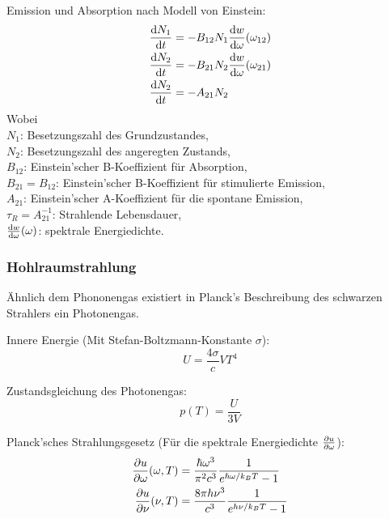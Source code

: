 			\noindent
			Emission und Absorption nach Modell von Einstein:
			\begin{equation}
				\begin{aligned}
					\frac{\mathrm{d} N_1}{\mathrm{d} t} &= -B_{12}N_1 \frac{\mathrm{d} w}{\mathrm{d} \omega}(\omega_{12}) \\
					\frac{\mathrm{d} N_2}{\mathrm{d} t} &= -B_{21}N_2 \frac{\mathrm{d} w}{\mathrm{d} \omega}(\omega_{21}) \\
					\frac{\mathrm{d} N_2}{\mathrm{d} t} &= -A_{21}N_2\\
				\end{aligned}
			\end{equation}
			Wobei \\
			\indent $N_1$: Besetzungszahl des Grundzustandes,\\
			\indent $N_2$: Besetzungszahl des angeregten Zustands,\\
			\indent $B_{12}$: Einstein'scher B-Koeffizient für Absorption,\\
			\indent $B_{21} = B_{12}$: Einstein'scher B-Koeffizient für stimulierte Emission,\\
			\indent $A_{21}$: Einstein'scher A-Koeffizient für die spontane Emission,\\
			\indent $\tau_{R}=A_{21}^{-1}$: Strahlende Lebensdauer,\\
			\indent $\frac{\mathrm{d} w}{\mathrm{d} \omega}(\omega)$: spektrale Energiedichte.\\

		\subsubsection{Hohlraumstrahlung}
			\noindent
			Ähnlich dem Phononengas existiert in Planck's Beschreibung des schwarzen Strahlers ein Photonengas. \vsp

			\noindent
			Innere Energie (Mit Stefan-Boltzmann-Konstante $\sigma$):
			\begin{equation}
				U = \frac{4\sigma}{c} V T^4
			\end{equation}

			\noindent
			Zustandsgleichung des Photonengas:
			\begin{equation}
				p(T) = \frac{U}{3V}
			\end{equation}

			\noindent
			Planck'sches Strahlungsgesetz (Für die spektrale Energiedichte $\frac{\partial u}{\partial \omega}$):
			\begin{equation}
					\begin{aligned}
							\frac{\partial u}{\partial \omega}(\omega,T) &= \frac{\hbar \omega^3}{\pi^2 c^3} \frac{1}{e^{\hbar \omega / k_B T} - 1} \\
							\frac{\partial u}{\partial \nu} (\nu, T) &= \frac{8 \pi h \nu^3}{c^3} \frac{1}{e^{h \nu / k_B T} - 1} \\
					\end{aligned}
			\end{equation}


